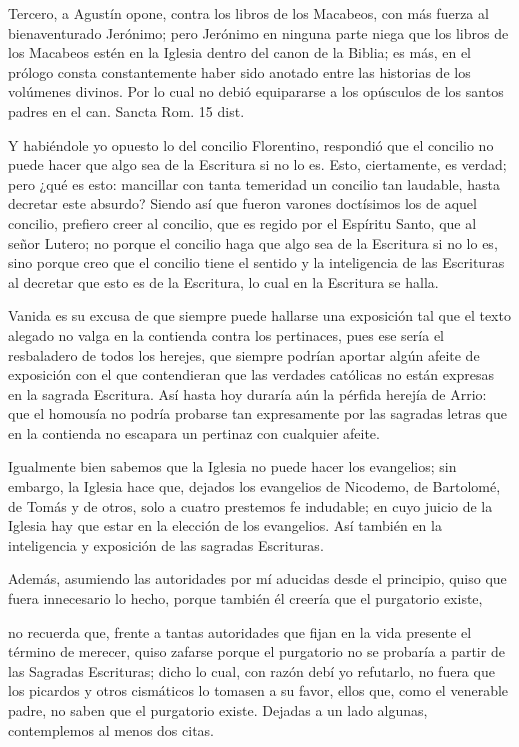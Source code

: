 Tercero, a Agustín opone, contra los libros de los Macabeos, con más fuerza al bienaventurado Jerónimo; pero Jerónimo en ninguna parte niega que los libros de los Macabeos estén en la Iglesia dentro del canon de la Biblia; es más, en el prólogo consta constantemente haber sido anotado entre las historias de los volúmenes divinos. Por lo cual no debió equipararse a los opúsculos de los santos padres en el can. Sancta Rom. 15 dist.

Y habiéndole yo opuesto lo del concilio Florentino, respondió que el concilio no puede \marginpar{\small[335]} hacer que algo sea de la Escritura si no lo es. Esto, ciertamente, es verdad; pero ¿qué es esto: mancillar con tanta temeridad un concilio tan laudable, hasta decretar este absurdo? Siendo así que fueron varones doctísimos los de aquel concilio, prefiero creer al concilio, que es regido por el Espíritu Santo, que al señor Lutero; no porque el concilio haga que algo sea de la Escritura si no lo es, sino porque creo que el concilio tiene el sentido y la inteligencia de las Escrituras al decretar que esto es de la Escritura, lo cual en la Escritura se halla.

Vanida es su excusa de que siempre puede hallarse una exposición tal que el texto alegado no valga en la contienda contra los pertinaces, pues ese sería el resbaladero de todos los herejes, que siempre podrían aportar algún afeite de exposición con el que contendieran que las verdades católicas no están expresas en la sagrada Escritura. Así hasta hoy duraría aún la pérfida herejía de Arrio: que el homousía no podría probarse tan expresamente por las sagradas letras que en la contienda no escapara un pertinaz con cualquier afeite.

Igualmente bien sabemos que la Iglesia no puede hacer los evangelios; sin embargo, la Iglesia hace que, dejados los evangelios de Nicodemo, de Bartolomé, de Tomás y de otros, solo a cuatro prestemos fe indudable; en cuyo juicio de la Iglesia hay que estar en la elección de los evangelios. Así también en la inteligencia y exposición de las sagradas Escrituras.

Además, asumiendo las autoridades por mí aducidas desde el principio, quiso que fuera innecesario lo hecho, porque también él creería que el purgatorio existe,

no recuerda que, frente a tantas autoridades que fijan en la vida presente el término de merecer, quiso zafarse porque el purgatorio no se probaría a partir de las Sagradas Escrituras; dicho lo cual, con razón debí yo refutarlo, no fuera que los picardos y otros cismáticos lo tomasen a su favor, ellos que, como el venerable padre, no saben que el purgatorio existe. Dejadas a un lado algunas, contemplemos al menos dos citas.

